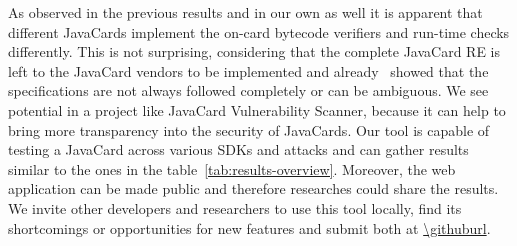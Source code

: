 \documentclass{../llncs/llncs}
\begin{document}
        As observed in the previous results and in our own as well it is apparent that different JavaCards implement the on-card bytecode verifiers and run-time checks differently. This is not surprising, considering that the complete JavaCard RE is left to the JavaCard vendors to be implemented and already~\cite{Mostowski07testingthe} showed that the specifications are not always followed completely or can be ambiguous.
        We see potential in a project like JavaCard Vulnerability Scanner, because it can help to bring more transparency into the security of JavaCards. Our tool is capable of testing a JavaCard across various SDKs and attacks and can gather results similar to the ones in the table~\ref{tab:results-overview}. Moreover, the web application can be made public and therefore researches could share the results. We invite other developers and researchers to use this tool locally, find its shortcomings or opportunities for new features and submit both at \url{\githuburl}. 

\end{document}
